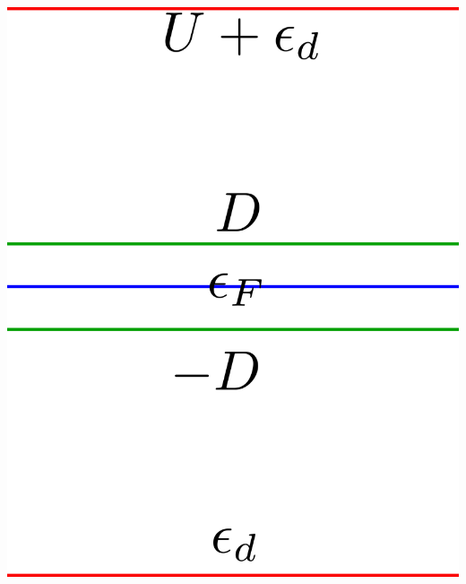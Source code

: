\documentclass[twoside]{report}
\numberwithin{equation}{section}
\begin{document}
\begin{minipage}{0.3\textwidth}
    \centering
    \includegraphics[width=\textwidth]{../figures/anderson.png}
    \label{and1}
\end{minipage}
\hspace*{\fill}
\end{document}
